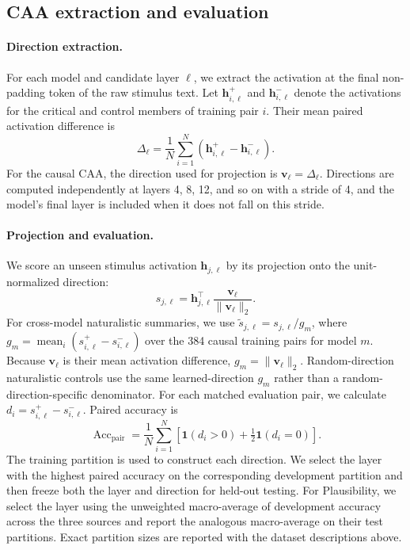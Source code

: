 \documentclass[11pt]{article}
\begin{document}


\subsection{CAA extraction and evaluation}
\label{app:caa-details}

\paragraph{Direction extraction.}
For each model and candidate layer $\ell$, we extract the activation at the
final non-padding token of the raw stimulus text. Let
$\mathbf{h}^{+}_{i,\ell}$ and $\mathbf{h}^{-}_{i,\ell}$ denote the activations
for the critical and control members of training pair $i$. Their mean paired
activation difference is
\begin{equation}
\Delta_{\ell}
=\frac{1}{N}\sum_{i=1}^{N}
\left(\mathbf{h}^{+}_{i,\ell}-\mathbf{h}^{-}_{i,\ell}\right).
\label{eq:caa-direction}
\end{equation}
For the causal CAA, the direction used for projection is
$\mathbf{v}_{\ell}=\Delta_{\ell}$.
Directions are computed independently at layers 4, 8,
12, and so on with a stride of 4, and the model's final layer is included when it does not fall on
this stride.

\paragraph{Projection and evaluation.}
We score an unseen stimulus activation $\mathbf{h}_{j,\ell}$ by its projection
onto the unit-normalized direction:
\begin{equation}
s_{j,\ell}
=\mathbf{h}_{j,\ell}^{\top}
\frac{\mathbf{v}_{\ell}}{\lVert\mathbf{v}_{\ell}\rVert_2}.
\label{eq:caa-projection}
\end{equation}
For cross-model naturalistic summaries, we use
$\widetilde{s}_{j,\ell}=s_{j,\ell}/g_m$, where
$g_m=\operatorname{mean}_{i}(s^+_{i,\ell}-s^-_{i,\ell})$ over the 384 causal
training pairs for model $m$. Because $\mathbf{v}_{\ell}$ is their mean
activation difference, $g_m=\lVert\mathbf{v}_{\ell}\rVert_2$. Random-direction
naturalistic controls use the same learned-direction $g_m$ rather than a
random-direction-specific denominator.
For each matched evaluation pair, we calculate
$d_i=s^{+}_{i,\ell}-s^{-}_{i,\ell}$. Paired accuracy is
\begin{equation}
\operatorname{Acc}_{\mathrm{pair}}
=\frac{1}{N}\sum_{i=1}^{N}
\left[\mathbf{1}(d_i>0)+\tfrac{1}{2}\mathbf{1}(d_i=0)\right].
\label{eq:caa-paired-accuracy}
\end{equation}
The training partition is used to construct each direction. We select the layer
with the highest paired accuracy on the corresponding development partition and
then freeze both the layer and direction for held-out testing. For Plausibility,
we select the layer using the unweighted macro-average of development accuracy
across the three sources and report the analogous macro-average on their test
partitions. Exact partition sizes are reported with the dataset descriptions above.
\end{document}
